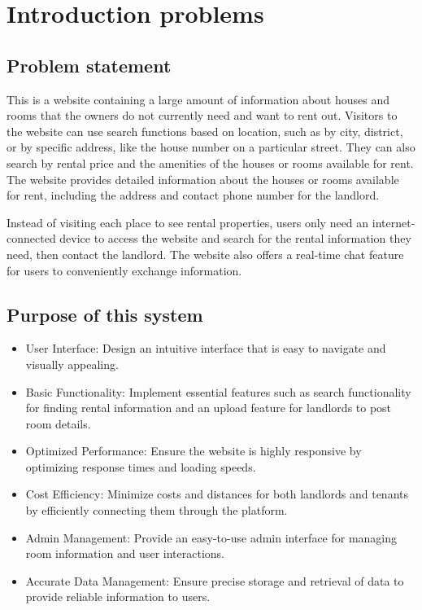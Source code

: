 \documentclass[../Main.tex]{subfiles}
\begin{document}
\section{Introduction problems}

\subsection{Problem statement}

This is a website containing a large amount of information about houses and rooms that the owners do not currently need and want to rent out.
Visitors to the website can use search functions based on location, such as by city, district, or by specific address, like the house number on a particular street.
They can also search by rental price and the amenities of the houses or rooms available for rent.
The website provides detailed information about the houses or rooms available for rent, including the address and contact phone number for the landlord.

Instead of visiting each place to see rental properties, users only need an internet-connected device to access the website and search for the rental information they need, then contact the landlord.
The website also offers a real-time chat feature for users to conveniently exchange information.

\subsection{Purpose of this system}

\begin{itemize}
    \item User Interface: Design an intuitive interface that is easy to navigate and visually appealing.
    \item Basic Functionality: Implement essential features such as search functionality for finding rental information and an upload feature for landlords to post room details.
    \item Optimized Performance: Ensure the website is highly responsive by optimizing response times and loading speeds.
    \item Cost Efficiency: Minimize costs and distances for both landlords and tenants by efficiently connecting them through the platform.
    \item Admin Management: Provide an easy-to-use admin interface for managing room information and user interactions.
    \item Accurate Data Management: Ensure precise storage and retrieval of data to provide reliable information to users.
\end{itemize}
\end{document}
